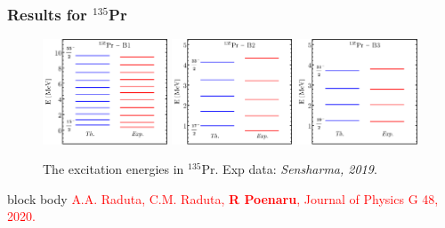 \documentclass{beamer}
\begin{document}
\begin{frame}
	\frametitle{Results for $^{135}$Pr}
	\begin{figure}
		\centering
		\includegraphics[width=0.33\textwidth]{figures/135Pr-New-Boson-Band1-Energies.pdf}
		\includegraphics[width=0.32\textwidth]{figures/135Pr-New-Boson-Band2-Energies.pdf}
		\includegraphics[width=0.32\textwidth]{figures/135Pr-New-Boson-Band3-Energies.pdf}
		\caption{The excitation energies in $^{135}$Pr. Exp data: \textit{Sensharma, 2019}.}
	\end{figure}
	\begin{table}
		\centering
	\end{table}
	\begin{beamercolorbox}[rounded=true,shadow=false, wd=\linewidth,]{block body}
		\centering
		\textcolor{red}{\footnotesize{A.A. Raduta, C.M. Raduta, \textbf{R Poenaru}, Journal of Physics G 48, 2020.}}
	\end{beamercolorbox}
\end{frame}
\end{document}
